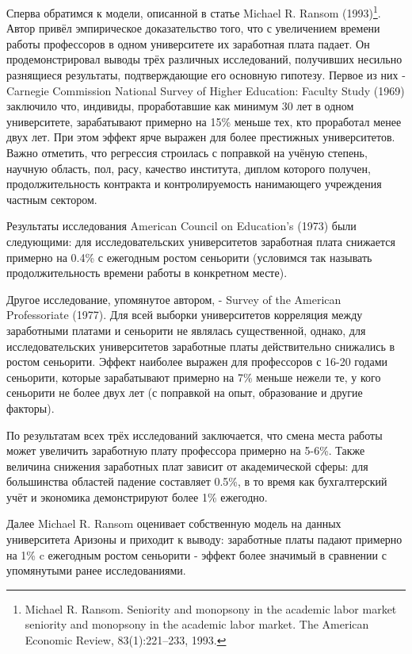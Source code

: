 \documentclass[a4paper, 12pt]{article}
\theoremstyle{definition}
\theoremstyle{plain}
\begin{document}
Сперва обратимся к модели, описанной в статье Michael R. Ransom (1993)\footnote{Michael R. Ransom. Seniority and monopsony in the academic labor market seniority and monopsony in the academic labor market. The American Economic Review, 83(1):221–233, 1993.}. Автор привёл эмпирическое доказательство того, что с увеличением времени работы профессоров в одном университете их заработная плата падает. Он продемонстрировал выводы трёх различных исследований, получивших несильно разнящиеся результаты, подтверждающие его основную гипотезу. Первое из них - Carnegie Commission National Survey of Higher Education: Faculty Study (1969) заключило что, индивиды, проработавшие как минимум 30 лет в одном университете, зарабатывают примерно на 15\%  меньше тех, кто проработал менее двух лет. При этом эффект ярче выражен для более престижных университетов. Важно отметить, что регрессия строилась с поправкой на учёную степень, научную область, пол, расу, качество института, диплом которого получен, продолжительность контракта и контролируемость нанимающего учреждения частным сектором. 

	Результаты исследования American Council on Education's (1973) были следующими:  для исследовательских университетов заработная плата снижается примерно на 0.4\% с ежегодным ростом сеньорити (условимся так называть продолжительность времени работы в конкретном месте). 
	
	Другое исследование, упомянутое автором, - Survey of the American Professoriate (1977). Для всей выборки университетов корреляция между заработными платами и сеньорити не являлась существенной, однако, для исследовательских университетов заработные платы действительно снижались в ростом сеньорити. Эффект наиболее выражен для профессоров с 16-20 годами сеньорити, которые зарабатывают примерно на 7\% меньше нежели те, у кого сеньорити не более двух лет (с поправкой на опыт, образование и другие факторы). 
	
	По результатам всех трёх исследований заключается, что смена места работы может увеличить заработную плату профессора примерно на 5-6\%. Также величина снижения заработных плат зависит от академической сферы: для большинства областей падение составляет 0.5\%, в то время как бухгалтерский учёт и экономика демонстрируют более 1\% ежегодно. 
	
	Далее Michael R. Ransom оценивает собственную модель на данных университета Аризоны и приходит к выводу: заработные платы падают примерно на 1\% c ежегодным ростом сеньорити - эффект более значимый в сравнении с упомянутыми ранее исследованиями. 
	
\end{document}
